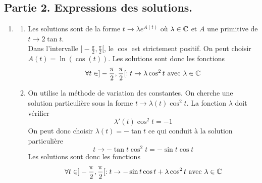 \subsection*{Partie 2. Expressions des solutions.}
\begin{enumerate}
 \item\begin{enumerate}
 \item Les solutions sont de la forme $t\rightarrow\lambda e^{A(t)}$ où $\lambda\in \mathbb{C}$ et $A$ une primitive de $t\rightarrow2\tan t$.\\
Dans l'intervalle $]-\frac{\pi}{2},\frac{\pi}{2}[$, le $\cos$ est strictement positif. On peut choisir $A(t)=\ln(\cos(t))$. Les solutions sont donc les fonctions
\begin{displaymath}
 \forall t \in ]-\frac{\pi}{2},\frac{\pi}{2}[ : t\rightarrow\lambda \cos^2t \text{ avec } \lambda\in \mathbb{C}
\end{displaymath}

\item On utilise la méthode de variation des constantes. On cherche une solution particulière sous la forme $t\rightarrow\lambda(t)\cos^2t$. La fonction $\lambda$ doit vérifier
\begin{displaymath}
 \lambda'(t)\cos^2t=-1
\end{displaymath}
On peut donc choisir $\lambda(t)=-\tan t$ ce qui conduit à la solution particulière
\begin{displaymath}
 t\rightarrow -\tan t \cos^2t=-\sin t \cos t
\end{displaymath}
 Les solutions sont donc les fonctions
\begin{displaymath}
 \forall t \in ]-\frac{\pi}{2},\frac{\pi}{2}[ : t\rightarrow -\sin t \cos t + \lambda \cos^2t \text{ avec } \lambda\in \mathbb{C}
\end{displaymath}
\end{enumerate}
 

\end{enumerate}
